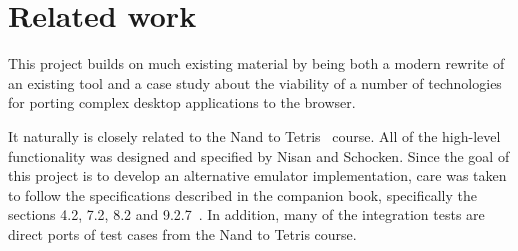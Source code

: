 \section{Related work}

This project builds on much existing material by being both a modern rewrite of an existing tool and a case study about the viability of a number of technologies for porting complex desktop applications to the browser.

It naturally is closely related to the Nand to Tetris~\cite{n2tweb} course. All of the high-level functionality was designed and specified by Nisan and Schocken.
Since the goal of this project is to develop an alternative emulator implementation, care was taken to follow the specifications described in the companion book, specifically the sections 4.2, 7.2, 8.2 and 9.2.7~\cite{nisan2005}.
In addition, many of the integration tests are direct ports of test cases from the Nand to Tetris course.



